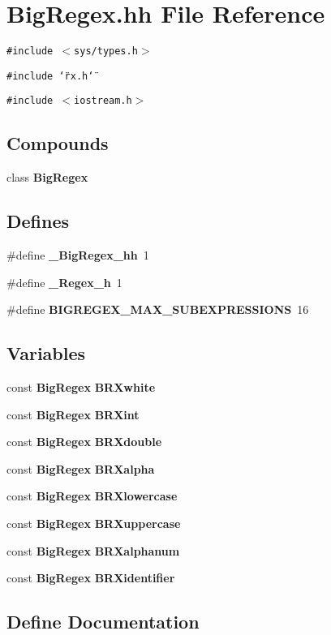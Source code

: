 \section{Big\-Regex.hh File Reference}
\label{BigRegex_8hh}
{\tt \#include $<$sys/types.h$>$}\par
{\tt \#include \char`\"{}rx.h\char`\"{}}\par
{\tt \#include $<$iostream.h$>$}\par
\subsection*{Compounds}
\begin{CompactItemize}
\item 
class {\bf Big\-Regex}
\end{CompactItemize}
\subsection*{Defines}
\begin{CompactItemize}
\item 
\#define {\bf \_\-Big\-Regex\_\-hh}\ 1
\item 
\#define {\bf \_\-Regex\_\-h}\ 1
\item 
\#define {\bf BIGREGEX\_\-MAX\_\-SUBEXPRESSIONS}\ 16
\end{CompactItemize}
\subsection*{Variables}
\begin{CompactItemize}
\item 
const {\bf Big\-Regex} {\bf BRXwhite}
\item 
const {\bf Big\-Regex} {\bf BRXint}
\item 
const {\bf Big\-Regex} {\bf BRXdouble}
\item 
const {\bf Big\-Regex} {\bf BRXalpha}
\item 
const {\bf Big\-Regex} {\bf BRXlowercase}
\item 
const {\bf Big\-Regex} {\bf BRXuppercase}
\item 
const {\bf Big\-Regex} {\bf BRXalphanum}
\item 
const {\bf Big\-Regex} {\bf BRXidentifier}
\end{CompactItemize}


\subsection{Define Documentation}
